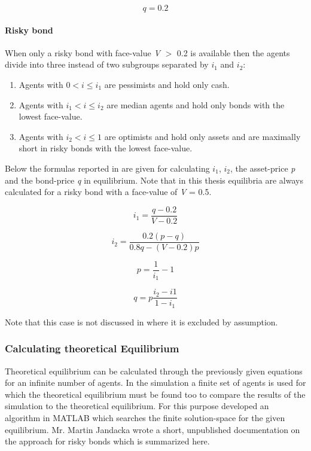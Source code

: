 \documentclass[../Bachelorarbeit.tex]{subfiles}
\begin{document}
\begin{equation}
q = 0.2
\end{equation}

\paragraph{Risky bond}
When only a risky bond with face-value \textit{V} $>$ 0.2 is available then the agents divide into three instead of two subgroups separated by $i_{1}$ and $i_{2}$:

\begin{enumerate}
\item Agents with $0 < i \leq i_{1}$ are pessimists and hold only cash.
\item Agents with $i_{1} < i \leq i_{2}$ are median agents and hold only bonds with the lowest face-value.
\item Agents with $i_{2} < i \leq 1$ are optimists and hold only assets and are maximally short in risky bonds with the lowest face-value.
\end{enumerate} 

Below the formulas reported in \cite{Breuer2015} are given for calculating $i_{1}$, $i_{2}$, the asset-price \textit{p} and the bond-price \textit{q} in equilibrium. Note that in this thesis equilibria are always calculated for a risky bond with a face-value of \textit{V} = 0.5.

\begin{equation}
i_{1} = \frac{q - 0.2}{V - 0.2}
\end{equation}

\begin{equation}
i_{2} = \frac{0.2(p - q)}{0.8q - (V - 0.2)p}
\end{equation}

\begin{equation}
p = \frac{1}{i_{1}} - 1
\end{equation}

\begin{equation}
q = p \frac{i_{2} - i{1}}{1 - i_{1}}
\end{equation}

Note that this case is not discussed in \cite{Geanakoplos2009} where it is excluded by assumption.

\subsubsection{Calculating theoretical Equilibrium}
Theoretical equilibrium can be calculated through the previously given equations for an infinite number of agents. In the simulation a finite set of agents is used for which the theoretical equilibrium must be found too to compare the results of the simulation to the theoretical equilibrium. For this purpose \cite{Breuer2015} developed an algorithm in MATLAB which searches the finite solution-space for the given equilibrium. Mr. Martin Jandacka wrote a short, unpublished documentation on the approach for risky bonds which is summarized here.
\end{document}
